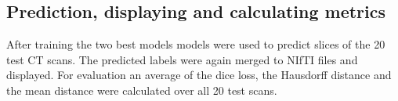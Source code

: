 \subsection{Prediction, displaying and calculating metrics}

After training the two best models models were used to predict slices of the 20 test CT scans. The predicted labels were again merged to NIfTI files and displayed. For evaluation an average of the dice loss, the Hausdorff distance and the mean distance were calculated over all 20 test scans.